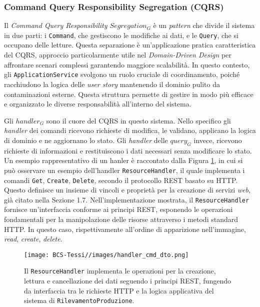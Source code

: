             \subsubsection{Command Query Responsibility Segregation (CQRS)}
            Il \textit{Command Query Responsibility $Segregation_G$} è un \textit{pattern} che divide il sistema in due parti: i \texttt{Command}, che gestiscono le modifiche ai dati, e le \texttt{Query}, che si occupano delle letture. Questa separazione è un'applicazione pratica caratteristica del CQRS, approccio particolarmente utile nel \textit{Domain-Driven Design} per affrontare scenari complessi garantendo maggiore scalabilità. In questo contesto, gli \texttt{ApplicationService} svolgono un ruolo cruciale di coordinamento, poiché racchiudono la logica delle \textit{user story} mantenendo il dominio pulito da contaminazioni esterne. Questa struttura permette di gestire in modo più efficace e organizzato le diverse responsabilità all'interno del sistema.

            \vspace{0.2 em}
            \noindent Gli $handler_G$ sono il cuore del CQRS in questo sistema. Nello specifico gli \textit{handler} dei comandi ricevono richieste di modifica, le validano, applicano la logica di dominio e ne aggiornano lo stato. Gli \textit{handler} delle $query_G$ invece, ricevono richieste di informazioni e restituiscono i dati necessari senza modificare lo stato. Un esempio rappresentativo di un hanler è raccontato dalla Figura \ref{fig:handler}, in cui si può osservare un esempio dell'handler \texttt{Resource}\texttt{Handler}, il quale implementa i comandi \texttt{Get}, \texttt{Create}, \texttt{Delete}, secondo il protocollo REST basato su HTTP. Questo definisce un insieme di vincoli e proprietà per la creazione di servizi \textit{web}, già citato nella Sezione 1.7. Nell'implementazione mostrata, il \texttt{Resource}\texttt{Handler} fornisce un'interfaccia conforme ai principi REST, esponendo le operazioni fondamentali per la manipolazione delle risorse attraverso i metodi standard HTTP. In questo caso, rispettivamente all'ordine di apparizione nell'immagine, \textit{read}, \textit{create}, \textit{delete}. 

            \begin{figure}[H]
                \centering
                \texttt{[image: BCS-Tessi//images/handler\_cmd\_dto.png]}
                \caption[Implementazione di \texttt{ResourceHandler} e i rispettivi metodi.]{Il \texttt{ResourceHandler} implementa le operazioni per la creazione, lettura e cancellazione dei dati seguendo i principi REST, fungendo da interfaccia tra le richieste HTTP e la logica applicativa del sistema di \texttt{Rilevamento}\texttt{Produzione}.}
                \label{fig:handler}
            \end{figure}

